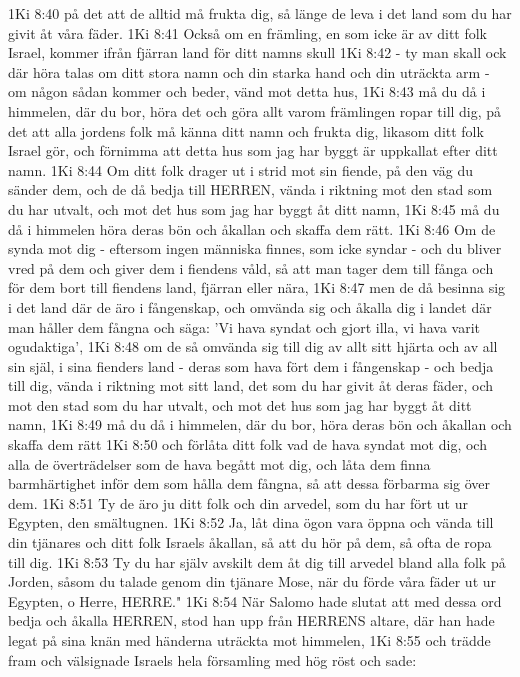 1Ki 8:40  på det att de alltid må frukta dig, så länge de leva i det land som du har givit åt våra fäder.
1Ki 8:41  Också om en främling, en som icke är av ditt folk Israel, kommer ifrån fjärran land för ditt namns skull
1Ki 8:42  - ty man skall ock där höra talas om ditt stora namn och din starka hand och din uträckta arm - om någon sådan kommer och beder, vänd mot detta hus,
1Ki 8:43  må du då i himmelen, där du bor, höra det och göra allt varom främlingen ropar till dig, på det att alla jordens folk må känna ditt namn och frukta dig, likasom ditt folk Israel gör, och förnimma att detta hus som jag har byggt är uppkallat efter ditt namn.
1Ki 8:44  Om ditt folk drager ut i strid mot sin fiende, på den väg du sänder dem, och de då bedja till HERREN, vända i riktning mot den stad som du har utvalt, och mot det hus som jag har byggt åt ditt namn,
1Ki 8:45  må du då i himmelen höra deras bön och åkallan och skaffa dem rätt.
1Ki 8:46  Om de synda mot dig - eftersom ingen människa finnes, som icke syndar - och du bliver vred på dem och giver dem i fiendens våld, så att man tager dem till fånga och för dem bort till fiendens land, fjärran eller nära,
1Ki 8:47  men de då besinna sig i det land där de äro i fångenskap, och omvända sig och åkalla dig i landet där man håller dem fångna och säga: 'Vi hava syndat och gjort illa, vi hava varit ogudaktiga',
1Ki 8:48  om de så omvända sig till dig av allt sitt hjärta och av all sin själ, i sina fienders land - deras som hava fört dem i fångenskap - och bedja till dig, vända i riktning mot sitt land, det som du har givit åt deras fäder, och mot den stad som du har utvalt, och mot det hus som jag har byggt åt ditt namn,
1Ki 8:49  må du då i himmelen, där du bor, höra deras bön och åkallan och skaffa dem rätt
1Ki 8:50  och förlåta ditt folk vad de hava syndat mot dig, och alla de överträdelser som de hava begått mot dig, och låta dem finna barmhärtighet inför dem som hålla dem fångna, så att dessa förbarma sig över dem.
1Ki 8:51  Ty de äro ju ditt folk och din arvedel, som du har fört ut ur Egypten, den smältugnen.
1Ki 8:52  Ja, låt dina ögon vara öppna och vända till din tjänares och ditt folk Israels åkallan, så att du hör på dem, så ofta de ropa till dig.
1Ki 8:53  Ty du har själv avskilt dem åt dig till arvedel bland alla folk på Jorden, såsom du talade genom din tjänare Mose, när du förde våra fäder ut ur Egypten, o Herre, HERRE."
1Ki 8:54  När Salomo hade slutat att med dessa ord bedja och åkalla HERREN, stod han upp från HERRENS altare, där han hade legat på sina knän med händerna uträckta mot himmelen,
1Ki 8:55  och trädde fram och välsignade Israels hela församling med hög röst och sade:
